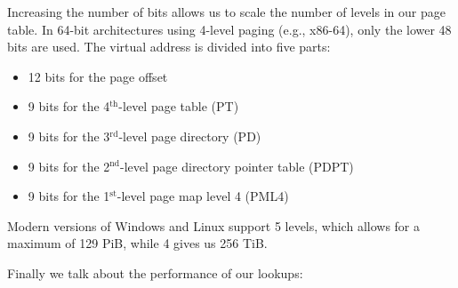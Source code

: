 \begin{Def}

    Increasing the number of bits allows us to scale the number of levels in our page table.
    In 64-bit architectures using 4-level paging (e.g., x86-64), only the lower 48 bits are used. The virtual address is divided into five parts:
    \begin{itemize}
        \item 12 bits for the page offset
        \item 9 bits for the 4$^{\text{th}}$-level page table (PT)
        \item 9 bits for the 3$^{\text{rd}}$-level page directory (PD)
        \item 9 bits for the 2$^{\text{nd}}$-level page directory pointer table (PDPT)
        \item 9 bits for the 1$^{\text{st}}$-level page map level 4 (PML4)
    \end{itemize}
    \noindent
    Modern versions of Windows and Linux support 5 levels, which allows for a maximum of 129 PiB, while 4 gives us 256 TiB.
\end{Def}

\newpage 

\noindent
Finally we talk about the performance of our lookups:

